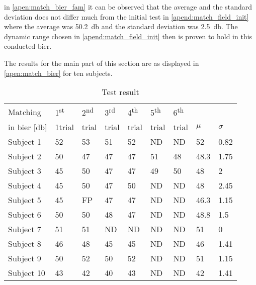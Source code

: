 in \autoref{apen:match_bier_fam}  it can be observed that the average and the standard deviation does not differ much from the initial test in \autoref{apend:match_field_init} where the average was \SI{50.2}{\decibel} and the standard deviation was \SI{2.5}{\decibel}. The dynamic range chosen in  \autoref{apend:match_field_init} then is proven to hold in this conducted \gls{bier}.


The results for the main part of this section are as displayed in \autoref{apen:match_bier} for ten subjects. 
\begin{table}[H]
\centering
\caption{Test result}
\begin{tabular}{lllllllll}
\multicolumn{1}{l|}{Matching }   & 1\textsuperscript{st}  & 2\textsuperscript{nd}  & 3\textsuperscript{rd}  & 4\textsuperscript{th} & 5\textsuperscript{th}  & \multicolumn{1}{l|}{6\textsuperscript{th} }                &    &  \\
\multicolumn{1}{l|}{in \gls{bier} [\si{\decibel}] }   & 1trial & trial &  trial &  trial &  trial & \multicolumn{1}{l|}{trial}                & $\mu$   & $\sigma$ \\ \hline
\multicolumn{1}{l|}{Subject 1}  & 52    & 53    & 51    & 52    & ND    & \multicolumn{1}{l|}{ND} & 52   & 0.82  \\
\multicolumn{1}{l|}{Subject 2} & 50    & 47    & 47    & 47    & 51    & \multicolumn{1}{l|}{48} & 48.3 & 1.75  \\
\multicolumn{1}{l|}{Subject 3}  & 45    & 50    & 47    & 47    & 49    & \multicolumn{1}{l|}{50} & 48   & 2     \\
\multicolumn{1}{l|}{Subject 4}  & 45    & 50    & 47    & 50    & ND    & \multicolumn{1}{l|}{ND} & 48   & 2.45  \\
\multicolumn{1}{l|}{Subject 5}  & 45    & FP    & 47    & 47    & ND    & \multicolumn{1}{l|}{ND} & 46.3 & 1.15  \\
\multicolumn{1}{l|}{Subject 6}  & 50    & 50    & 48    & 47    & ND    & \multicolumn{1}{l|}{ND} & 48.8 & 1.5   \\
\multicolumn{1}{l|}{Subject 7}  & 51    & 51    & ND    & ND    & ND    & \multicolumn{1}{l|}{ND} & 51   & 0     \\
\multicolumn{1}{l|}{Subject 8}  & 46    & 48    & 45    & 45    & ND    & \multicolumn{1}{l|}{ND} & 46   & 1.41  \\
\multicolumn{1}{l|}{Subject 9}  & 50    & 52    & 50    & 52    & ND    & \multicolumn{1}{l|}{ND} & 51   & 1.15  \\
\multicolumn{1}{l|}{Subject 10}  & 43    & 42    & 40    & 43    & ND    & \multicolumn{1}{l|}{ND} & 42   & 1.41
\end{tabular}
\label{apen:match_bier} 
\end{table}


